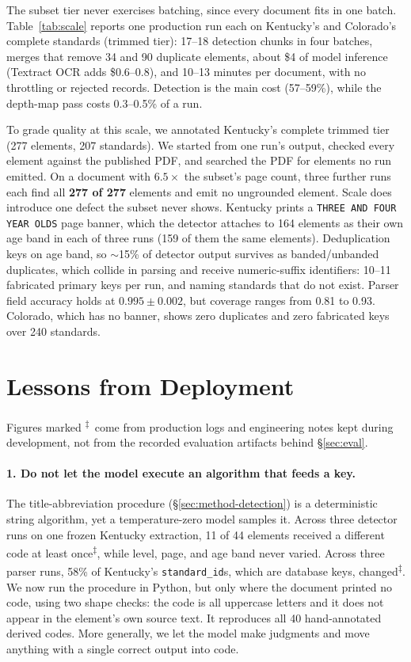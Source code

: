 \documentclass[11pt]{article}
\newcommand{\elog}{\textsuperscript{$\ddagger$}}
\begin{document}


The subset tier never exercises batching, since every document fits in one batch. Table~\ref{tab:scale} reports one production run each on Kentucky's and Colorado's complete standards (trimmed tier): 17--18 detection chunks in four batches, merges that remove 34 and 90 duplicate elements, about \$4 of model inference (Textract OCR adds \$0.6--0.8), and 10--13 minutes per document, with no throttling or rejected records. Detection is the main cost (57--59\%), while the depth-map pass costs 0.3--0.5\% of a run.

To grade quality at this scale, we annotated Kentucky's complete trimmed tier (277 elements, 207 standards). We started from one run's output, checked every element against the published PDF, and searched the PDF for elements no run emitted. On a document with $6.5\times$ the subset's page count, three further runs each find all \textbf{277 of 277} elements and emit no ungrounded element. Scale does introduce one defect the subset never shows. Kentucky prints a \texttt{THREE AND FOUR YEAR OLDS} page banner, which the detector attaches to 164 elements as their own age band in each of three runs (159 of them the same elements). Deduplication keys on age band, so ${\sim}$15\% of detector output survives as banded/unbanded duplicates, which collide in parsing and receive numeric-suffix identifiers: 10--11 fabricated primary keys per run, and naming standards that do not exist. Parser field accuracy holds at $0.995\pm0.002$, but coverage ranges from 0.81 to 0.93. Colorado, which has no banner, shows zero duplicates and zero fabricated keys over 240 standards.

\section{Lessons from Deployment}
\label{sec:lessons}\label{sec:method-confidence}\label{sec:experiments-confidence}

Figures marked \elog\ come from production logs and engineering notes kept
during development, not from the recorded evaluation artifacts behind
\S\ref{sec:eval}.

\paragraph{1. Do not let the model execute an algorithm that feeds a key.} The title-abbreviation procedure (\S\ref{sec:method-detection}) is a deterministic string algorithm, yet a temperature-zero model samples it. Across three detector runs on one frozen Kentucky extraction, 11 of 44 elements received a different code at least once\elog, while level, page, and age band never varied. Across three parser runs, 58\% of Kentucky's \texttt{standard\_id}s, which are database keys, changed\elog. We now run the procedure in Python, but only where the document printed no code, using two shape checks: the code is all uppercase letters and it does not appear in the element's own source text. It reproduces all 40 hand-annotated derived codes. More generally, we let the model make judgments and move anything with a single correct output into code.
\end{document}
